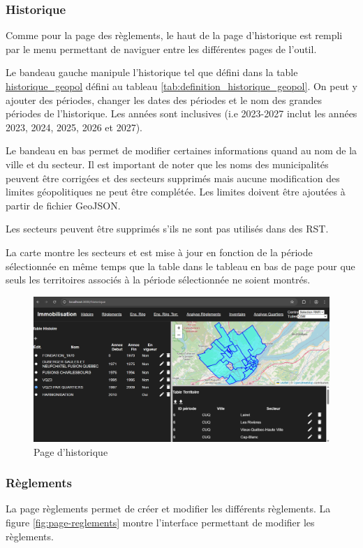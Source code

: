 \subsubsection{Historique}
Comme pour la page des règlements, le haut de la page d'historique est rempli par le menu permettant de naviguer entre les différentes pages de l'outil.\par
Le bandeau gauche manipule l'historique tel que défini dans la table \ul{historique\_geopol} défini au tableau \ref{tab:definition_historique_geopol}. On peut y ajouter des périodes, changer les dates des périodes et le nom des grandes périodes de l'historique. Les années sont inclusives (i.e 2023-2027 inclut les années 2023, 2024, 2025, 2026 et 2027).\par
Le bandeau en bas permet de modifier certaines informations quand au nom de la ville et du secteur. Il est important de noter que les noms des municipalités peuvent être corrigées et des secteurs supprimés mais aucune modification des limites géopolitiques ne peut être complétée. Les limites doivent être ajoutées à partir de fichier GeoJSON.\par
Les secteurs peuvent être supprimés s'ils ne sont pas utilisés dans des \ac{RST}.\par
La carte montre les secteurs et est mise à jour en fonction de la période sélectionnée en même temps que la table dans le tableau en bas de page pour que seuls les territoires associés à la période sélectionnée ne soient montrés.
\begin{landscape}
    \begin{figure}
        \centering
        \includegraphics[width=1\linewidth]{images/PageHistorique.png}
        \caption{Page d'historique}
        \label{fig:page_historique}
    \end{figure}
\end{landscape}
\subsubsection{Règlements}
La page règlements permet de créer et modifier les différents règlements. La figure \ref{fig:page-reglements} montre l'interface permettant de modifier les règlements. 

